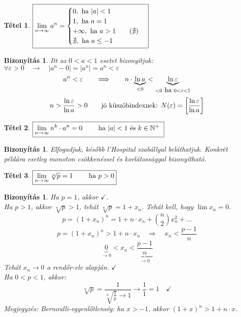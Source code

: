 \documentclass[a4paper,12pt,twoside]{book}
\newtheorem{tetel}{Tétel}[chapter]
\theoremstyle{break}
\newtheorem{bizNL}[biz]{Bizonyítás}
\theoremstyle{plain}
\begin{document}
\begin{tetel}\label{aAzNediken}$\displaystyle \boxed{\lim_{n\to\infty} a^n=\begin{cases}
  0, \hbox{ ha } |a|<1 \\
  1, \hbox{ ha } a=1 \\
  +\infty, \hbox{ ha } a>1 \qquad (\nexists) \\
  \nexists, \hbox{ ha } a\leq -1
\end{cases}}$\\
\end{tetel}
\begin{bizNL}
Itt az $0<a<1$ esetet bizonyítjuk:\\
$\forall \varepsilon > 0 \quad \rightarrow \quad |a^n-0|=|a^n|=a^n<\varepsilon$
\[a^n<\varepsilon \qquad \Longrightarrow \qquad n\cdot \underbrace{\ln a}_{<0} < \underbrace{\ln \varepsilon}_{<0 \hbox{ ha } 0<\varepsilon<1}\]
\[n>\frac{\ln\varepsilon}{\ln a}>0 \qquad \hbox{jó küszöbindexnek: } N(\varepsilon)=\left[\frac{\ln\varepsilon}{\ln a}\right]\]
\end{bizNL}

\begin{tetel}\label{nKaN_Tart0}
 $\displaystyle \boxed{ \lim_{n\to\infty} n^k\cdot a^n = 0 \qquad $ ha $|a|<1$ és $k\in\mathbb{N}^+$ $}$
\end{tetel}
\begin{bizNL}
Elfogadjuk, később l'Hospital szabállyal beláthatjuk. Konkrét példára esetleg monoton csök\-kenéssel és korlátossággal bizonyítható.
\end{bizNL}

\begin{tetel}$\displaystyle \boxed{\lim_{n\to\infty} \sqrt[n]{p}=1 \qquad $ ha $p>0}$\\
\end{tetel}
\begin{bizNL}
Ha $p=1$, akkor $\checkmark$.\\
Ha $p>1$, akkor $\sqrt[n]{p}>1$, tehát $\sqrt[n]{p}=1+x_n$. Tehát kell, hogy $\lim x_n = 0$.
\[p=(1+x_n)^n=1+n\cdot x_n+\binom{n}{2}x^2_n+\ldots\]
\[p=(1+x_n)^n > 1+n\cdot x_n \quad \Rightarrow \quad x_n < \frac{p-1}{n}\]
\[\underbrace{0}_{\to 0} < x_n < \underbrace{\frac{p-1}{n}}_{\to 0}\]
Tehát $x_n\to 0$ a rendőr-elv alapján. $\checkmark$\\
Ha $0<p<1$, akkor:\\
\[\sqrt[n]{p}=\frac{1}{\sqrt[n]{\frac{1}{p}} \to 1} \to \frac{1}{1} = 1 \quad \checkmark\]
\textit{Megjegyzés}: Bernoulli-egyenlőtlenség: ha $x>-1$, akkor $(1+x)^n>1+n\cdot x$.
\end{bizNL}
\end{document}
